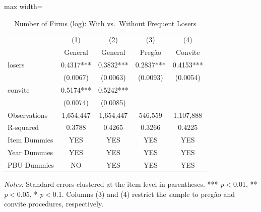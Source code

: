 \begin{table}[htbp]
\centering
\caption{Number of Firms (log): With vs.\ Without Frequent Losers}
\label{tab:nfirms}
\begin{adjustbox}{max width=\textwidth}
\begin{threeparttable}
\small
\begin{tabular}{lcccc}
\toprule
 & (1) & (2) & (3) & (4) \\
 & General & General & Preg\~{a}o & Convite \\
\midrule
losers & 0.4317*** & 0.3832*** & 0.2837*** & 0.4153*** \\
 & (0.0067) & (0.0063) & (0.0093) & (0.0054) \\
convite & 0.5174*** & 0.5242*** &  &  \\
 & (0.0074) & (0.0085) &  &  \\
\midrule
Observations & 1,654,447 & 1,654,447 & 546,559 & 1,107,888 \\
R-squared & 0.3788 & 0.4265 & 0.3266 & 0.4225 \\
Item Dummies & YES & YES & YES & YES \\
Year Dummies & YES & YES & YES & YES \\
PBU Dummies & NO & YES & YES & YES \\
\bottomrule
\end{tabular}
\begin{tablenotes}
\small
\item \textit{Notes:} Standard errors clustered at the item level in parentheses.
*** \textit{p}$<$0.01, ** \textit{p}$<$0.05, * \textit{p}$<$0.1.
Columns (3) and (4) restrict the sample to preg\~{a}o and convite procedures, respectively.
\end{tablenotes}
\end{threeparttable}
\end{adjustbox}
\end{table}
